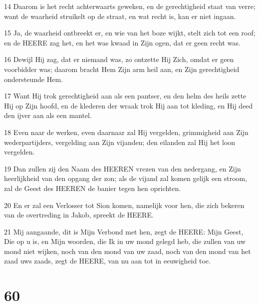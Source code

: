 \par 14 Daarom is het recht achterwaarts geweken, en de gerechtigheid staat van verre; want de waarheid struikelt op de straat, en wat recht is, kan er niet ingaan.
\par 15 Ja, de waarheid ontbreekt er, en wie van het boze wijkt, stelt zich tot een roof; en de HEERE zag het, en het was kwaad in Zijn ogen, dat er geen recht was.
\par 16 Dewijl Hij zag, dat er niemand was, zo ontzette Hij Zich, omdat er geen voorbidder was; daarom bracht Hem Zijn arm heil aan, en Zijn gerechtigheid ondersteunde Hem.
\par 17 Want Hij trok gerechtigheid aan als een pantser, en den helm des heils zette Hij op Zijn hoofd, en de klederen der wraak trok Hij aan tot kleding, en Hij deed den ijver aan als een mantel.
\par 18 Even naar de werken, even daarnaar zal Hij vergelden, grimmigheid aan Zijn wederpartijders, vergelding aan Zijn vijanden; den eilanden zal Hij het loon vergelden.
\par 19 Dan zullen zij den Naam des HEEREN vrezen van den nedergang, en Zijn heerlijkheid van den opgang der zon; als de vijand zal komen gelijk een stroom, zal de Geest des HEEREN de banier tegen hen oprichten.
\par 20 En er zal een Verlosser tot Sion komen, namelijk voor hen, die zich bekeren van de overtreding in Jakob, spreekt de HEERE.
\par 21 Mij aangaande, dit is Mijn Verbond met hen, zegt de HEERE: Mijn Geest, Die op u is, en Mijn woorden, die Ik in uw mond gelegd heb, die zullen van uw mond niet wijken, noch van den mond van uw zaad, noch van den mond van het zaad uws zaads, zegt de HEERE, van nu aan tot in eeuwigheid toe.

\chapter{60}

